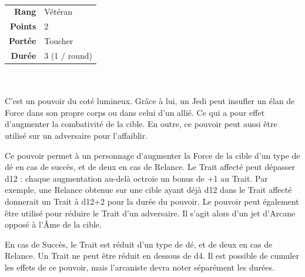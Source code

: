 \begin{description}[align=left] 

    \item [Chaleur de Force] ~ \\

        \begin{tabular}{ r l }
            \textbf{Rang}    & Vétéran \\
            \textbf{Points}  & 2 \\
            \textbf{Portée}  & Toucher \\
            \textbf{Durée}   & 3 (1 / round) \\
        \end{tabular}
        \\ \\
        C'est un pouvoir du coté lumineux. Grâce à lui, un Jedi peut insufler un élan de Force dans son propre corps ou dans celui d'un allié. Ce qui a pour effet d'augmenter la combativité de la cible. En outre, ce pouvoir peut aussi être utilisé sur un adversaire pour l'affaiblir.

        Ce pouvoir permet à un personnage d’augmenter la Force de la cible d’un type de dé en cas de succès, et de deux en cas de Relance. Le Trait affecté peut dépasser d12 : chaque augmentation au-delà octroie un bonus de +1 au Trait. Par exemple, une Relance obtenue sur une cible ayant déjà d12 dans le Trait affecté donnerait un Trait à d12+2 pour la durée du pouvoir. Le pouvoir peut également être utilisé pour réduire le Trait d’un adversaire. Il s’agit alors d’un jet d’Arcane opposé à l’Âme de la cible.

        En cas de Succès, le Trait est réduit d’un type de dé, et de deux en cas de Relance. Un Trait ne peut être réduit en dessous de d4. Il est possible de cumuler les effets de ce pouvoir, mais l’arcaniste devra noter séparément les durées.
        \\

    \item [Guérison de Force] ~ \\


\end{description}
